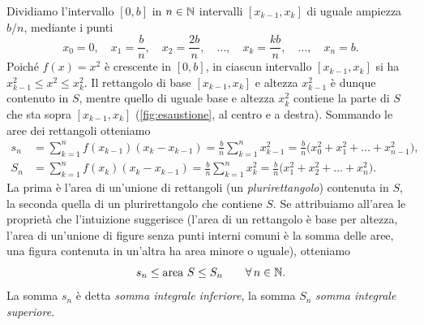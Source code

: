 Dividiamo l'intervallo $[0,b]$ in $n\in\mathbb{N}$ intervalli $[x_{k-1},x_{k}]$ di uguale
ampiezza $b/n$, mediante i punti
\begin{equation}\label{eq:partizione-uniforme-parabola}
  x_{0}=0,\quad x_{1}=\frac bn,\quad x_{2}=\frac{2b}n,\quad\dots,\quad
  x_{k}=\frac{kb}n,\quad\dots,\quad x_{n}=b .
\end{equation}
Poiché $f(x)=x^{2}$ è crescente in $[0,b]$, in ciascun intervallo $[x_{k-1},x_{k}]$ si
ha $x_{k-1}^{2}\le x^{2}\le x_{k}^{2}$. Il rettangolo di base $[x_{k-1},x_{k}]$ e altezza
$x_{k-1}^{2}$ è dunque contenuto in $S$, mentre quello di uguale base e altezza
$x_{k}^{2}$ contiene la parte di $S$ che sta sopra $[x_{k-1},x_{k}]$
(\cref{fig:esaustione}, al centro e a destra). Sommando le aree dei rettangoli
otteniamo
\begin{align}
  s_{n}&=\sum_{k=1}^{n}f(x_{k-1})(x_{k}-x_{k-1})=\frac bn\sum_{k=1}^{n}x_{k-1}^{2}
  =\frac bn\bigl(x_{0}^{2}+x_{1}^{2}+\dots+x_{n-1}^{2}\bigr),
  \label{eq:somma-inferiore-parabola}\\
  S_{n}&=\sum_{k=1}^{n}f(x_{k})(x_{k}-x_{k-1})=\frac bn\sum_{k=1}^{n}x_{k}^{2}
  =\frac bn\bigl(x_{1}^{2}+x_{2}^{2}+\dots+x_{n}^{2}\bigr).
  \label{eq:somma-superiore-parabola}
\end{align}
La prima è l'area di un'unione di rettangoli (un \emph{plurirettangolo}) contenuta in
$S$, la seconda quella di un plurirettangolo che contiene $S$. Se attribuiamo all'area
le proprietà che l'intuizione suggerisce (l'area di un rettangolo è base per altezza,
l'area di un'unione di figure senza punti interni comuni è la somma delle aree, una
figura contenuta in un'altra ha area minore o uguale), otteniamo
\begin{equation}\label{eq:stime-parabola}
  s_{n}\le\text{area }S\le S_{n} \qquad\forall\, n\in\mathbb{N} .
\end{equation}
La somma $s_{n}$ è detta \emph{somma integrale inferiore}, la somma $S_{n}$
\emph{somma integrale superiore}.


